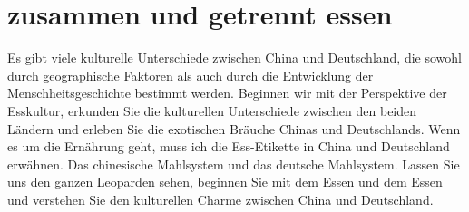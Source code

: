 \section{zusammen und getrennt essen}
Es gibt viele kulturelle Unterschiede zwischen China und Deutschland, die sowohl durch geographische Faktoren als auch durch die Entwicklung der Menschheitsgeschichte bestimmt werden. Beginnen wir mit der Perspektive der Esskultur, erkunden Sie die kulturellen Unterschiede zwischen den beiden Ländern und erleben Sie die exotischen Bräuche Chinas und Deutschlands. Wenn es um die Ernährung geht, muss ich die Ess-Etikette in China und Deutschland erwähnen. Das chinesische Mahlsystem und das deutsche Mahlsystem. Lassen Sie uns den ganzen Leoparden sehen, beginnen Sie mit dem Essen und dem Essen und verstehen Sie den kulturellen Charme zwischen China und Deutschland.


